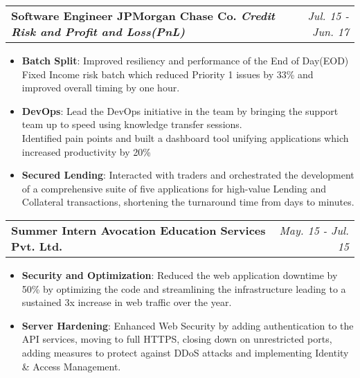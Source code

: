 \documentclass[a4paper,10pt]{article}
\makeatletter
\newcommand{\resumeItem}[2]{
  \vspace{-0.5pt} \item\small{
    \textbf{#1}{: #2}
  }
}
\newcommand{\resumeSubheading}[3]{
	\item
	\textbf{#2} \textbar{} \textbf{#1} \hfill \textit{#3}
}
\newcommand{\projectHeading}[2]{
  \item
    \begin{tabular*}{0.97\textwidth}{l@{\extracolsep{\fill}}r}
      \large{\textbf{#1}} & \textit{\small #2} \\
    \end{tabular*}\vspace{-1.5pt}
}
\newcommand{\resumeItemListStart}{\vspace{-1pt}\begin{itemize}[leftmargin=*]\setlength\itemsep{.5pt}}
\newcommand{\resumeItemListEnd}{\end{itemize}}
\makeatother
\begin{document}
  
    \projectHeading
      {Software Engineer \textbar{} JPMorgan Chase Co. \textbar{} \textit{\small Credit Risk and Profit and Loss(PnL)}}
     {Jul. 15 - Jun. 17}
      \resumeItemListStart
         \resumeItem{Batch Split}
          {Improved resiliency and performance of the End of Day(EOD) Fixed Income risk batch which  reduced Priority 1 issues by 33\% and improved overall timing by one hour.}
        \resumeItem{DevOps}
        {Lead the DevOps initiative in the team by bringing the support team up to speed using knowledge transfer sessions. \\
        Identified pain points and built a dashboard tool unifying applications which increased productivity by 20\%}
        \resumeItem{Secured Lending}
          {Interacted with traders and orchestrated the development of a comprehensive suite of five applications for high-value Lending and Collateral transactions, shortening the turnaround time from days to minutes.}
      \resumeItemListEnd
      
   
    \projectHeading{Summer Intern \textbar{} Avocation Education Services Pvt. Ltd.}
   {May. 15 - Jul. 15}
   \resumeItemListStart
   		\resumeItem{Security and Optimization}
   		{Reduced the web application downtime by 50\% by optimizing the code and streamlining the infrastructure leading to a sustained 3x increase in web traffic over the year.}
   		\resumeItem{Server Hardening}
   		{Enhanced Web Security by adding authentication to the API services, moving to full HTTPS, closing down on unrestricted ports, adding measures to protect against DDoS attacks and implementing Identity \& Access Management.}
   \resumeItemListEnd
   

      
 
\end{document}
